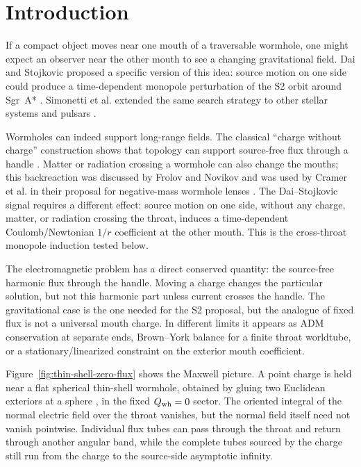 \documentclass[aps,prd,10pt,onecolumn,nofootinbib,superscriptaddress,floatfix]{revtex4-2}
\begin{document}
\section{Introduction}
\label{sec:intro}

If a compact object moves near one mouth of a traversable wormhole, one might
expect an observer near the other mouth to see a changing gravitational field.
Dai and Stojkovic proposed a specific version of this idea: source motion on
one side could produce a time-dependent monopole perturbation of the S2 orbit
around Sgr~A*
\cite{DaiStojkovic2019Observing,DaiStojkovic2020ReplyObserving}.
Simonetti et al. extended the same search strategy to other stellar systems and
pulsars \cite{SimonettiEtAl2021SensitiveSearches}.

Wormholes can indeed support long-range fields.  The classical ``charge without
charge'' construction shows that topology can support source-free flux through
a handle \cite{MisnerWheeler1957ClassicalPhysics,Wheeler1962Geometrodynamics}.
Matter or radiation crossing a wormhole can also change the mouths; this
backreaction was discussed by Frolov and Novikov
\cite{FrolovNovikov1990PhysicalEffects} and was used by Cramer et al. in their
proposal for negative-mass wormhole lenses
\cite{CramerEtAl1995NaturalWormholes}.  The Dai--Stojkovic signal requires a
different effect: source motion on one side, without any charge, matter, or
radiation crossing the throat, induces a time-dependent Coulomb/Newtonian
$1/r$ coefficient at the other mouth.  This is the cross-throat monopole
induction tested below.

The electromagnetic problem has a direct conserved quantity: the source-free
harmonic flux through the handle.  Moving a charge changes the particular
solution, but not this harmonic part unless current crosses the handle.  The
gravitational case is the one needed for the S2 proposal, but the analogue of
fixed flux is not a universal mouth charge.  In different limits it appears as
ADM conservation at separate ends, Brown--York balance for a finite throat
worldtube, or a stationary/linearized constraint on the exterior mouth
coefficient.

Figure~\ref{fig:thin-shell-zero-flux} shows the Maxwell picture.  A point charge
is held near a flat spherical thin-shell wormhole, obtained by gluing two
Euclidean exteriors at a sphere
\cite{Visser1995LorentzianWormholes}, in the fixed $Q_{\rm wh}=0$ sector.  The
oriented integral of the normal electric field over the throat vanishes, but the
normal field itself need not vanish pointwise.  Individual flux tubes can pass
through the throat and return through another angular band, while the complete
tubes sourced by the charge still run from the charge to the source-side
asymptotic infinity.
\end{document}
